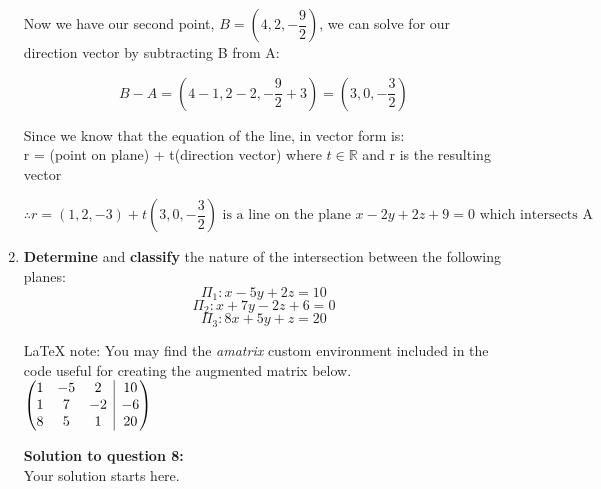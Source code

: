 \documentclass[12pt]{book}
\makeatletter
\newenvironment{amatrix}[1]{%
  \left(\begin{array}{@{}*{#1}{c}|c@{}}
}{%
  \end{array}\right)
}
\makeatother
\begin{document}
\begin{enumerate}
\vspace{-1cm}
Now we have our second point, $B = \left( 4, 2, -\dfrac{9}{2} \right)$, we can solve for our direction vector by subtracting B from A:

$$B-A = \left( 4-1, 2-2, -\dfrac{9}{2}+3 \right) = \left( 3, 0, -\dfrac{3}{2} \right)$$

Since we know that the equation of the line, in vector form is: \\
r = (point on plane) + t(direction vector) where $t \in \mathbb{R}$  and r is the resulting vector

\vspace{0.5cm}
\begin{center}
  $\boxed{\therefore r = (1, 2, -3) + t(3, 0, -\dfrac{3}{2}) \text{ is a line on the plane } x-2y+2z+9=0 \text{ which intersects A}}$
\end{center}

\vspace{0.3cm}

\newpage

\item \textbf{Determine} and \textbf{classify} the nature of the intersection between the following planes:
$$\Pi_1: x-5y+2z=10 $$
$$\Pi_2: x+7y-2z+6=0 $$
$$\Pi_3: 8x+5y+z=20 $$


\LaTeX{} note: You may find the \emph{amatrix} custom environment included in the code useful for creating the augmented matrix below.\\

$
\begin{amatrix}{3}
   1 & -5 & 2 & 10\\  1 & 7 & -2  & -6\\ 8 & 5 & 1 & 20 
 \end{amatrix}
$

\vspace{0.3cm} 
\textbf{Solution to question 8:}\\
 Your solution starts here.
\vspace{0.3cm}


\newpage



\end{enumerate}
\end{document}
